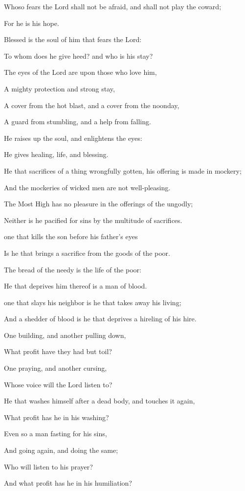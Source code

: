 {\par }{\Q {}Whoso fears the Lord shall not be afraid, and shall not play the coward;
\par }{\Q For he is his hope.
\par }{\Q {}Blessed is the soul of him that fears the Lord:
\par }{\Q To whom does he give heed? and who is his stay?
\par }{\Q {}The eyes of the Lord are upon those who love him,
\par }{\Q A mighty protection and strong stay,
\par }{\Q A cover from the hot blast, and a cover from the noonday,
\par }{\Q A guard from stumbling, and a help from falling.
\par }{\Q {}He raises up the soul, and enlightens the eyes:
\par }{\Q He gives healing, life, and blessing.
\par }{\BB \par }{\Q {}He that sacrifices of a thing wrongfully gotten, his offering is made in mockery;
\par }{\Q And the mockeries of wicked men are not well-pleasing.
\par }{\Q {}The Most High has no pleasure in the offerings of the ungodly;
\par }{\Q Neither is he pacified for sins by the multitude of sacrifices.
\par }{\Q {} one that kills the son before his father’s eyes
\par }{\Q Is he that brings a sacrifice from the goods of the poor.
\par }{\Q {}The bread of the needy is the life of the poor:
\par }{\Q He that deprives him thereof is a man of blood.
\par }{\Q {} one that slays his neighbor is he that takes away his living;
\par }{\Q And
{} a shedder of blood is he that deprives a hireling of his hire.
\par }{\Q {}One building, and another pulling down,
\par }{\Q What profit have they had but toil?
\par }{\Q {}One praying, and another cursing,
\par }{\Q Whose voice will the Lord listen to?
\par }{\Q {}He that washes himself after
{} a dead body, and touches it again,
\par }{\Q What profit has he in his washing?
\par }{\Q {}Even so a man fasting for his sins,
\par }{\Q And going again, and doing the same;
\par }{\Q Who will listen to his prayer?
\par }{\Q And what profit has he in his humiliation?
\par }{\BB \par }

